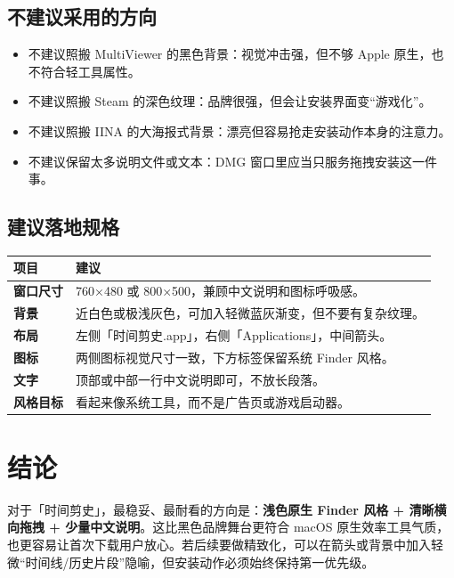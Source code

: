 \documentclass[11pt,a4paper]{article}
\begin{document}
\subsection{不建议采用的方向}

\begin{itemize}
  \item 不建议照搬 MultiViewer 的黑色背景：视觉冲击强，但不够 Apple 原生，也不符合轻工具属性。
  \item 不建议照搬 Steam 的深色纹理：品牌很强，但会让安装界面变“游戏化”。
  \item 不建议照搬 IINA 的大海报式背景：漂亮但容易抢走安装动作本身的注意力。
  \item 不建议保留太多说明文件或文本：DMG 窗口里应当只服务拖拽安装这一件事。
\end{itemize}

\subsection{建议落地规格}

\begin{table}[htbp]
\centering
\renewcommand{\arraystretch}{1.25}
\begin{tabularx}{\linewidth}{>{\bfseries}l X}
\toprule
项目 & 建议 \\
\midrule
窗口尺寸 & 760×480 或 800×500，兼顾中文说明和图标呼吸感。 \\
背景 & 近白色或极浅灰色，可加入轻微蓝灰渐变，但不要有复杂纹理。 \\
布局 & 左侧「时间剪史.app」，右侧「Applications」，中间箭头。 \\
图标 & 两侧图标视觉尺寸一致，下方标签保留系统 Finder 风格。 \\
文字 & 顶部或中部一行中文说明即可，不放长段落。 \\
风格目标 & 看起来像系统工具，而不是广告页或游戏启动器。 \\
\bottomrule
\end{tabularx}
\end{table}

\section{结论}

对于「时间剪史」，最稳妥、最耐看的方向是：\textbf{浅色原生 Finder 风格 + 清晰横向拖拽 + 少量中文说明}。这比黑色品牌舞台更符合 macOS 原生效率工具气质，也更容易让首次下载用户放心。若后续要做精致化，可以在箭头或背景中加入轻微“时间线/历史片段”隐喻，但安装动作必须始终保持第一优先级。
\end{document}
